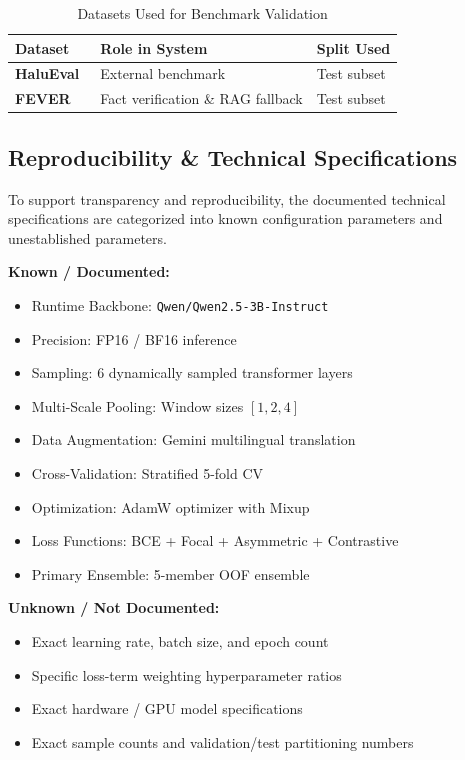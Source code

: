 \documentclass[conference]{IEEEtran}
\begin{document}
\begin{table}[htbp]
\caption{Datasets Used for Benchmark Validation}
\begin{center}
\begin{tabular}{lll}
\toprule
\textbf{Dataset} & \textbf{Role in System} & \textbf{Split Used} \\
\midrule
\textbf{HaluEval}~\cite{li2023halueval} & External benchmark & Test subset \\
\textbf{FEVER}~\cite{thorne2018fever} & Fact verification \& RAG fallback & Test subset \\
\bottomrule
\end{tabular}
\label{tab:datasets}
\end{center}
\end{table}

\subsection{Reproducibility \& Technical Specifications}
To support transparency and reproducibility, the documented technical specifications are categorized into known configuration parameters and unestablished parameters.

\textbf{Known / Documented:}
\begin{itemize}
    \item Runtime Backbone: \texttt{Qwen/Qwen2.5-3B-Instruct}
    \item Precision: FP16 / BF16 inference
    \item Sampling: 6 dynamically sampled transformer layers
    \item Multi-Scale Pooling: Window sizes $[1, 2, 4]$
    \item Data Augmentation: Gemini multilingual translation
    \item Cross-Validation: Stratified 5-fold CV
    \item Optimization: AdamW optimizer with Mixup
    \item Loss Functions: BCE + Focal + Asymmetric + Contrastive
    \item Primary Ensemble: 5-member OOF ensemble
\end{itemize}

\textbf{Unknown / Not Documented:}
\begin{itemize}
    \item Exact learning rate, batch size, and epoch count
    \item Specific loss-term weighting hyperparameter ratios
    \item Exact hardware / GPU model specifications
    \item Exact sample counts and validation/test partitioning numbers
\end{itemize}
\end{document}

